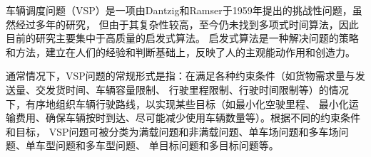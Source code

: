 
车辆调度问题（VSP）是一项由Dantzig和Ramser于1959年提出的挑战性问题，虽然经过多年的研究，
但由于其复杂性较高，至今仍未找到多项式时间算法，因此目前的研究主要集中于高质量的启发式算法。
启发式算法是一种解决问题的策略和方法，建立在人们的经验和判断基础上，反映了人的主观能动作用和创造力。

通常情况下，VSP问题的常规形式是指：在满足各种约束条件（如货物需求量与发送量、交发货时间、车辆容量限制、
行驶里程限制、行驶时间限制等）的情况下，有序地组织车辆行驶路线，以实现某些目标（如最小化空驶里程、
最小化运输费用、确保车辆按时到达、尽可能减少使用车辆数量等）。根据不同的约束条件和目标，
VSP问题可被分类为满载问题和非满载问题、单车场问题和多车场问题、单车型问题和多车型问题、
单目标问题和多目标问题等。



